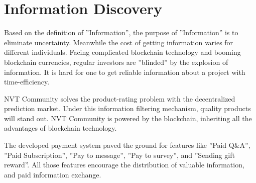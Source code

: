 
\section{Information Discovery}

Based on the definition of ”Information”, the purpose of ”Information” is to eliminate uncertainty. Meanwhile the cost of getting information varies for different individuals. Facing complicated blockchain technology and booming blockchain currencies, regular investors are ”blinded” by the explosion of information. It is hard for one to get reliable information about a project with time-efficiency.

NVT Community solves the product-rating problem with the decentralized prediction market. Under this information filtering mechanism, quality products will stand out. NVT Community is powered by the blockchain, inheriting all the advantages of blockchain technology.

The developed payment system paved the ground for features like ”Paid Q\&A”, ”Paid Subscription”, ”Pay to message”, ”Pay to survey”, and ”Sending gift reward”. All those features encourage the distribution of valuable information, and paid information exchange.